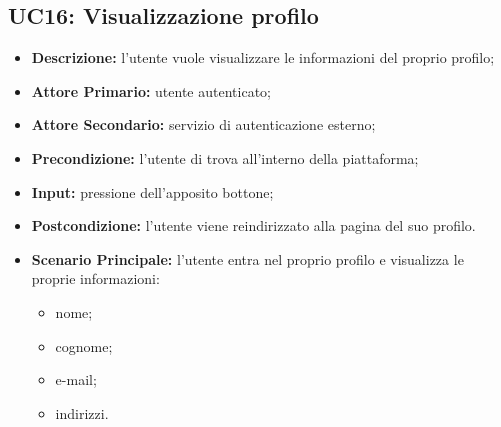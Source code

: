 \subsection{UC16: Visualizzazione profilo}
\label{sec:UC16}
\begin{itemize}
    \item \textbf{Descrizione:} l'utente vuole visualizzare le informazioni del proprio profilo;
    \item \textbf{Attore Primario:} utente autenticato;
    \item \textbf{Attore Secondario:} servizio di autenticazione esterno;
    \item \textbf{Precondizione:} l'utente di trova all'interno della piattaforma;
    \item \textbf{Input:} pressione dell'apposito bottone;
    \item \textbf{Postcondizione:} l'utente viene reindirizzato alla pagina del suo profilo.
    \item \textbf{Scenario Principale:} l'utente entra nel proprio profilo e visualizza le proprie informazioni:
          \begin{itemize}
              \item nome;
              \item cognome;
              \item e-mail;
              \item indirizzi.
          \end{itemize}
\end{itemize}